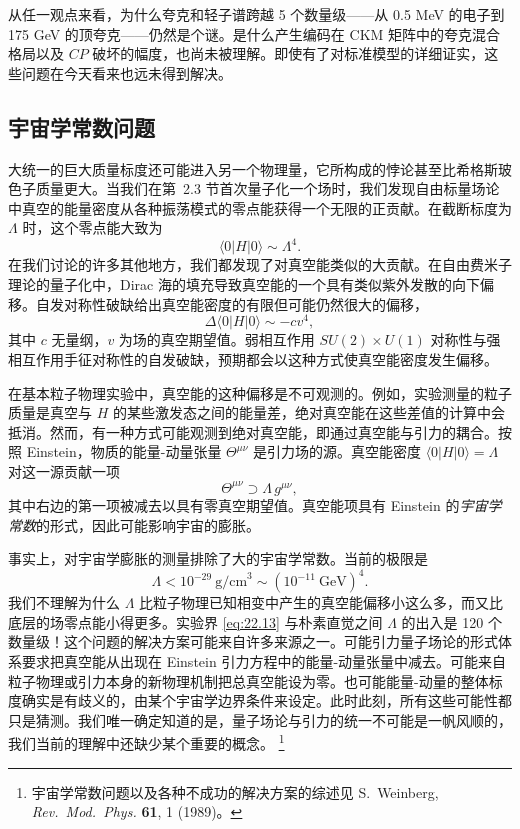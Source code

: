 从任一观点来看，为什么夸克和轻子谱跨越 5 个数量级——从 0.5 MeV 的电子到 175 GeV 的顶夸克——仍然是个谜。是什么产生编码在 CKM 矩阵中的夸克混合格局以及 $CP$ 破坏的幅度，也尚未被理解。即使有了对标准模型的详细证实，这些问题在今天看来也远未得到解决。

\subsection{宇宙学常数问题}

大统一的巨大质量标度还可能进入另一个物理量，它所构成的悖论甚至比希格斯玻色子质量更大。当我们在第~2.3 节首次量子化一个场时，我们发现自由标量场论中真空的能量密度从各种振荡模式的零点能获得一个无限的正贡献。在截断标度为 $\Lambda$ 时，这个零点能大致为
\begin{equation}
  \langle 0|H|0\rangle \sim \Lambda^4 .
  \label{eq:22.10}
\end{equation}
在我们讨论的许多其他地方，我们都发现了对真空能类似的大贡献。在自由费米子理论的量子化中，Dirac 海的填充导致真空能的一个具有类似紫外发散的向下偏移。自发对称性破缺给出真空能密度的有限但可能仍然很大的偏移，
\begin{equation}
  \Delta\langle 0|H|0\rangle \sim -cv^4 ,
  \label{eq:22.11}
\end{equation}
其中 $c$ 无量纲，$v$ 为场的真空期望值。弱相互作用 $SU(2)\times U(1)$ 对称性与强相互作用手征对称性的自发破缺，预期都会以这种方式使真空能密度发生偏移。

在基本粒子物理实验中，真空能的这种偏移是不可观测的。例如，实验测量的粒子质量是真空与 $H$ 的某些激发态之间的能量差，绝对真空能在这些差值的计算中会抵消。然而，有一种方式可能观测到绝对真空能，即通过真空能与引力的耦合。按照 Einstein，物质的能量-动量张量 $\Theta^{\mu\nu}$ 是引力场的源。真空能密度 $\langle 0|H|0\rangle = \Lambda$ 对这一源贡献一项
\begin{equation}
  \Theta^{\mu\nu} \supset \Lambda\,g^{\mu\nu} ,
  \label{eq:22.12}
\end{equation}
其中右边的第一项被减去以具有零真空期望值。真空能项具有 Einstein 的\emph{宇宙学常数}的形式，因此可能影响宇宙的膨胀。

事实上，对宇宙学膨胀的测量排除了大的宇宙学常数。当前的极限是
\begin{equation}
  \Lambda < 10^{-29}\ \mathrm{g/cm}^3 \sim (10^{-11}\ \mathrm{GeV})^4 .
  \label{eq:22.13}
\end{equation}
我们不理解为什么 $\Lambda$ 比粒子物理已知相变中产生的真空能偏移小这么多，而又比底层的场零点能小得更多。实验界 \eqref{eq:22.13} 与朴素直觉之间 $\Lambda$ 的出入是 120 个数量级！这个问题的解决方案可能来自许多来源之一。可能引力量子场论的形式体系要求把真空能从出现在 Einstein 引力方程中的能量-动量张量中减去。可能来自粒子物理或引力本身的新物理机制把总真空能设为零。也可能能量-动量的整体标度确实是有歧义的，由某个宇宙学边界条件来设定。此时此刻，所有这些可能性都只是猜测。我们唯一确定知道的是，量子场论与引力的统一不可能是一帆风顺的，我们当前的理解中还缺少某个重要的概念。%
\footnote{宇宙学常数问题以及各种不成功的解决方案的综述见 S.~Weinberg, \emph{Rev.\ Mod.\ Phys.} \textbf{61}, 1 (1989)。}


